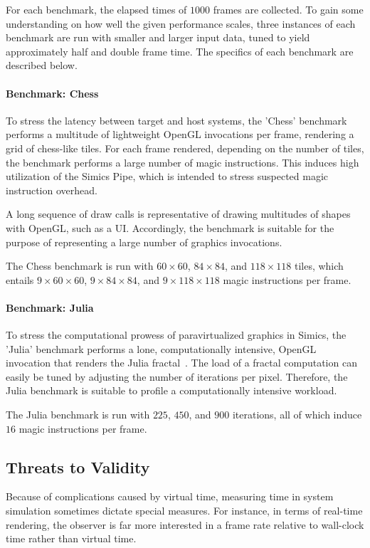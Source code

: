 For each benchmark, the elapsed times of $1000$ frames are collected.
To gain some understanding on how well the given performance scales, three instances of each benchmark are run with smaller and larger input data, tuned to yield approximately half and double frame time.
The specifics of each benchmark are described below.



\paragraph{Benchmark: Chess}
To stress the latency between target and host systems, the 'Chess' benchmark performs a multitude of lightweight OpenGL invocations per frame, rendering a grid of chess-like tiles.
For each frame rendered, depending on the number of tiles, the benchmark performs a large number of magic instructions.
This induces high utilization of the Simics Pipe, which is intended to stress suspected magic instruction overhead.

A long sequence of draw calls is representative of drawing multitudes of shapes with OpenGL, such as a UI.
Accordingly, the benchmark is suitable for the purpose of representing a large number of graphics invocations.

The Chess benchmark is run with $60\times60$, $84\times84$, and $118\times118$ tiles, which entails $9\times60\times60$, $9\times84\times84$, and $9\times118\times118$ magic instructions per frame.

\paragraph{Benchmark: Julia}
To stress the computational prowess of paravirtualized graphics in Simics, the 'Julia' benchmark performs a lone, computationally intensive, OpenGL invocation that renders the Julia fractal~.
The load of a fractal computation can easily be tuned by adjusting the number of iterations per pixel.
Therefore, the Julia benchmark is suitable to profile a computationally intensive workload. %

The Julia benchmark is run with $225$, $450$, and $900$ iterations, all of which induce $16$ magic instructions per frame.

\subsection{Threats to Validity}
\label{sec:threatstovalidity}
Because of complications caused by virtual time, measuring time in system simulation sometimes dictate special measures.
For instance, in terms of real-time rendering, the observer is far more interested in a frame rate relative to wall-clock time rather than virtual time.

